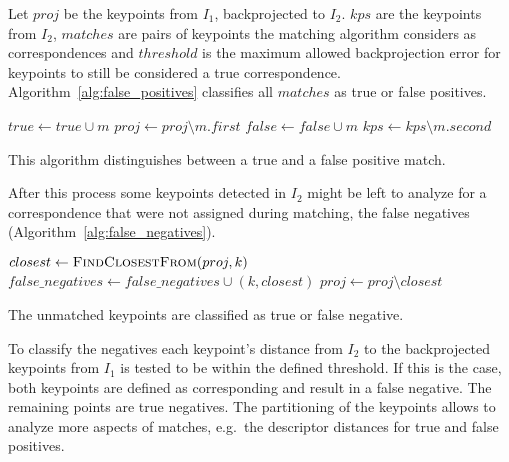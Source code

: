 Let $proj$ be the keypoints from $I_1$, backprojected to $I_2$.
$kps$ are the keypoints from $I_2$, $matches$ are pairs of keypoints the matching algorithm considers as correspondences and $threshold$ is the maximum allowed backprojection error for keypoints to still be considered a true correspondence.
Algorithm~\ref{alg:false_positives} classifies all $matches$ as true or false positives.
\begin{algorithm}[H]
\footnotesize
\begin{algorithmic}[0]
        \State$true \gets true \cup m$
        \State$proj \gets proj \setminus m.first$
    \Else%
        \State$false \gets false \cup m$
    \EndIf%
    \State$kps \gets kps \setminus m.second$
    \EndFor%
    \EndFunction%
\end{algorithmic}
\caption{This algorithm distinguishes between a true and a false positive match.}\label{alg:false_positives}
\end{algorithm}
After this process some keypoints detected in $I_2$ might be left to analyze for a correspondence that were not assigned during matching, the false negatives (Algorithm~\ref{alg:false_negatives}).
\begin{algorithm}[H]
\footnotesize
\begin{algorithmic}
        \State$closest \gets \Call{FindClosestFrom}{proj, k}$
            \State$false\_negatives \gets false\_negatives \cup (k, closest)$
            \State$proj \gets proj \setminus closest$
        \EndIf
    \EndFor%
    \EndFunction%
\end{algorithmic}
\caption{The unmatched keypoints are classified as true or false negative.}\label{alg:false_negatives}
\end{algorithm}
To classify the negatives each keypoint's distance from $I_2$ to the backprojected keypoints from $I_1$ is tested to be within the defined threshold.
If this is the case, both keypoints are defined as corresponding and result in a false negative. The remaining points are true negatives.
The partitioning of the keypoints allows to analyze more aspects of matches, e.g.~the descriptor distances for true and false positives.

